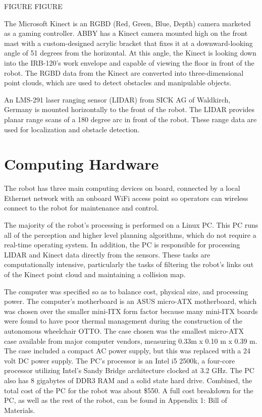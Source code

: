 \documentclass[]{cwru} %
\begin{document}
FIGURE FIGURE

The Microsoft Kinect is an RGBD (Red, Green, Blue, Depth) camera
marketed as a gaming controller. ABBY has a Kinect camera mounted high
on the front mast with a custom-designed acrylic bracket that fixes it
at a downward-looking angle of 51 degrees from the horizontal. At this
angle, the Kinect is looking down into the IRB-120's work envelope and
capable of viewing the floor in front of the robot. The RGBD data from
the Kinect are converted into three-dimensional point clouds, which are
used to detect obstacles and manipulable objects.

An LMS-291 laser ranging sensor (LIDAR) from SICK AG of Waldkirch,
Germany is mounted horizontally to the front of the robot. The LIDAR
provides planar range scans of a 180 degree arc in front of the robot.
These range data are used for localization and obstacle detection.

\section{Computing Hardware}
\label{computing-hw}

The robot has three main computing devices on board, connected by a
local Ethernet network with an onboard WiFi access point so operators
can wireless connect to the robot for maintenance and control.

The majority of the robot's processing is performed on a Linux PC. This
PC runs all of the perception and higher level planning algorithms,
which do not require a real-time operating system. In addition, the PC
is responsible for processing LIDAR and Kinect data directly from the
sensors. These tasks are computationally intensive, particularly the
tasks of filtering the robot's links out of the Kinect point cloud and
maintaining a collision map.

The computer was specified so as to balance cost, physical size, and
processing power. The computer's motherboard is an ASUS micro-ATX
motherboard, which was chosen over the smaller mini-ITX form factor
because many mini-ITX boards were found to have poor thermal management
during the construction of the autonomous wheelchair OTTO. The case
chosen was the smallest micro-ATX case available from major computer
vendors, measuring 0.33m x 0.10 m x 0.39 m. The case included a compact
AC power supply, but this was replaced with a 24 volt DC power supply.
The PC's processor is an Intel i5 2500k, a four-core processor utilizing
Intel's Sandy Bridge architecture clocked at 3.2 GHz. The PC also has 8
gigabytes of DDR3 RAM and a solid state hard drive. Combined, the total
cost of the PC for the robot was about \$550. A full cost breakdown for
the PC, as well as the rest of the robot, can be found in Appendix 1:
Bill of Materials.
\end{document}
